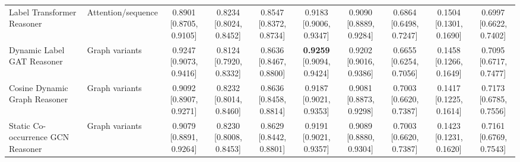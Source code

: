 \documentclass[Afour,sagev,times]{sagej}
\begin{document}
\begin{table}[h]
{\begin{tabular}{ll*{8}{c}}
Label Transformer Reasoner & Attention/sequence & \shortstack{0.8901\\{[}0.8705, 0.9105{]}} & \shortstack{0.8234\\{[}0.8024, 0.8452{]}} & \shortstack{0.8547\\{[}0.8372, 0.8734{]}} & \shortstack{0.9183\\{[}0.9006, 0.9347{]}} & \shortstack{0.9090\\{[}0.8889, 0.9284{]}} & \shortstack{0.6864\\{[}0.6498, 0.7247{]}} & \shortstack{0.1504\\{[}0.1301, 0.1690{]}} & \shortstack{0.6997\\{[}0.6622, 0.7402{]}} \\
Dynamic Label GAT Reasoner & Graph variants & \shortstack{0.9247\\{[}0.9073, 0.9416{]}} & \shortstack{0.8124\\{[}0.7920, 0.8332{]}} & \shortstack{0.8636\\{[}0.8467, 0.8800{]}} & \shortstack{\textbf{0.9259}\\{[}0.9094, 0.9424{]}} & \shortstack{0.9202\\{[}0.9016, 0.9386{]}} & \shortstack{0.6655\\{[}0.6254, 0.7056{]}} & \shortstack{0.1458\\{[}0.1266, 0.1649{]}} & \shortstack{0.7095\\{[}0.6717, 0.7477{]}} \\
Cosine Dynamic Graph Reasoner & Graph variants & \shortstack{0.9092\\{[}0.8907, 0.9271{]}} & \shortstack{0.8232\\{[}0.8014, 0.8460{]}} & \shortstack{0.8636\\{[}0.8458, 0.8814{]}} & \shortstack{0.9187\\{[}0.9021, 0.9353{]}} & \shortstack{0.9081\\{[}0.8873, 0.9298{]}} & \shortstack{0.7003\\{[}0.6620, 0.7387{]}} & \shortstack{0.1417\\{[}0.1225, 0.1614{]}} & \shortstack{0.7173\\{[}0.6785, 0.7556{]}} \\
Static Co-occurrence GCN Reasoner & Graph variants & \shortstack{0.9079\\{[}0.8891, 0.9264{]}} & \shortstack{0.8230\\{[}0.8008, 0.8453{]}} & \shortstack{0.8629\\{[}0.8442, 0.8801{]}} & \shortstack{0.9191\\{[}0.9021, 0.9357{]}} & \shortstack{0.9089\\{[}0.8880, 0.9304{]}} & \shortstack{0.7003\\{[}0.6620, 0.7387{]}} & \shortstack{0.1423\\{[}0.1231, 0.1620{]}} & \shortstack{0.7161\\{[}0.6769, 0.7543{]}} \\

\end{tabular}}
\end{table}
\end{document}
